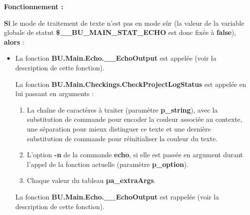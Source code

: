 \documentclass[a4paper,10pt]{article}
\begin{document}
\begin{justify}
    \setlength{\parskip}{1em}

    \textbf{Fonctionnement :}

    \textbf{\color{cond}Si} le mode de traitement de texte n'est pas en mode sûr (la valeur de la variable globale de statut \textbf{\color{vars}\$\_\_BU\_MAIN\_STAT\_ECHO} est donc fixée à \textbf{false}), \textbf{\color{cond}alors} :

    \begin{itemize}
        \item
        {
            \begin{justify}
                La fonction \textbf{\color{func}BU.Main.Echo.\_\_EchoOutput} est appelée (voir la description de cette fonction).
            \end{justify}

            \setlength{\parskip}{1em}

            \begin{justify}
                La fonction \textbf{\color{func}BU.Main.Checkings.CheckProjectLogStatus} est appelée en lui passant en arguments :
                \begin{enumerate}
                    \item La chaîne de caractères à traiter (paramètre \textbf{\color{vars}p\_string}), avec la substitution de commande pour encoder la couleur associée au contexte, une séparation pour mieux distinguer ce texte et une dernière substitution de commande pour réinitialiser la couleur du texte.
                    \item L'option \textbf{\color{cmds}-n} de la commande \textbf{\color{cmds}echo}, si elle est passée en argument durant l'appel de la fonction actuelle (paramètre \textbf{\color{vars}p\_option}).
                    \item Chaque valeur du tableau \textbf{\color{vars}pa\_extraArgs}.
                \end{enumerate}
            \end{justify}

            \setlength{\parskip}{1em}

            \begin{justify}
                La fonction \textbf{\color{func}BU.Main.Echo.\_\_EchoOutput} est rappelée (voir la description de cette fonction).
            \end{justify}
        }
    \end{itemize}
\end{justify}
\end{document}

